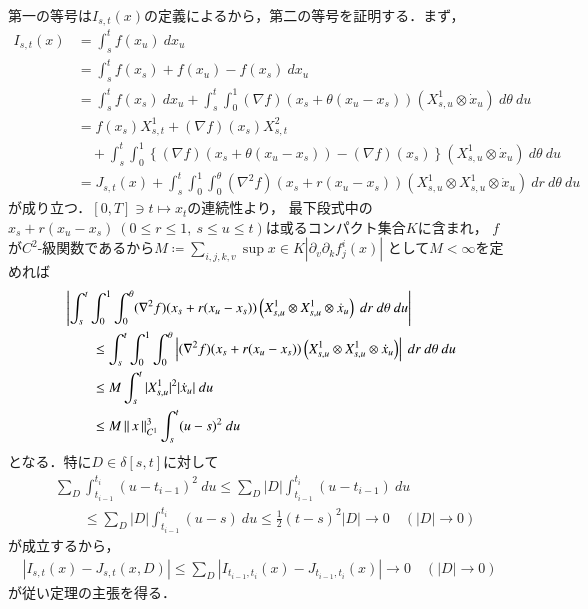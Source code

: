 	\begin{prf}
		第一の等号は$I_{s,t}(x)$の定義によるから，第二の等号を証明する．まず，
		\begin{align}
			I_{s,t}(x)
			&= \int_s^t f(x_u)\ dx_u \\
			&= \int_s^t f(x_s) + f(x_u) - f(x_s)\ dx_u \\
			&= \int_s^t f(x_s)\ dx_u
				+ \int_s^t \int_0^1 (\nabla f)(x_s + \theta(x_u - x_s)) \left( X^1_{s,u} \otimes \dot{x}_u \right)\ d\theta\ du \\
			&= f(x_s)X^1_{s,t} + (\nabla f)(x_s) X^2_{s,t} \\
				&\quad+ \int_s^t \int_0^1 \left\{ (\nabla f)(x_s + \theta(x_u - x_s)) - (\nabla f)(x_s) \right\}\left( X^1_{s,u} \otimes \dot{x}_u \right)\ d\theta\ du \\
			&= J_{s,t}(x)
				+ \int_s^t 
				\int_0^1 \int_0^\theta (\nabla^2 f)(x_s + r(x_u - x_s))\left( X^1_{s,u} \otimes X^1_{s,u} \otimes \dot{x}_u \right)\ dr\ d\theta\ du
		\end{align}
		が成り立つ．$[0,T] \ni t \longmapsto x_t$の連続性より，
		最下段式中の$x_s + r(x_u - x_s)\ (0 \leq r \leq 1,\ s \leq u \leq t)$は或るコンパクト集合$K$に含まれ，
		$f$が$C^2$-級関数であるから$
		M \coloneqq \sum_{i,j,k,v} \sup{x \in K}{\left|\partial_v \partial_k f_j^i(x) \right|}$
		として$M < \infty$を定めれば
		\begin{align}
			&\left| \int_s^t 
				\int_0^1 \int_0^\theta (\nabla^2 f)(x_s + r(x_u - x_s))\left( X^1_{s,u} \otimes X^1_{s,u} \otimes \dot{x}_u \right)\ dr\ d\theta\ du \right| \\
			&\qquad \leq \int_s^t 
				\int_0^1 \int_0^\theta \left| (\nabla^2 f)(x_s + r(x_u - x_s))\left( X^1_{s,u} \otimes X^1_{s,u} \otimes \dot{x}_u \right) \right|\ dr\ d\theta\ du \\
			&\qquad \leq M \int_s^t |X^1_{s,u}|^2 |\dot{x}_u|\ du \\
			&\qquad \leq M \Norm{x}{C^1}^3 \int_s^t (u - s)^2\ du
		\end{align}
		となる．特に$D \in \delta[s,t]$に対して
		\begin{align}
			&\sum_D \int_{t_{i-1}}^{t_i} (u - t_{i-1})^2\ du
			\leq \sum_D |D| \int_{t_{i-1}}^{t_i} (u - t_{i-1})\ du \\
			&\qquad \leq \sum_D |D| \int_{t_{i-1}}^{t_i} (u - s)\ du
			\leq \frac{1}{2}(t-s)^2 |D|
			\longrightarrow 0 \quad (|D| \longrightarrow 0)
		\end{align}
		が成立するから，
		\begin{align}
			\left| I_{s,t}(x) - J_{s,t}(x,D) \right|
			\leq \sum_D \left| I_{t_{i-1},t_i}(x) - J_{t_{i-1},t_i}(x) \right| \longrightarrow 0 \quad (|D| \longrightarrow 0)
		\end{align}
		が従い定理の主張を得る．
		\QED
	\end{prf}
	
